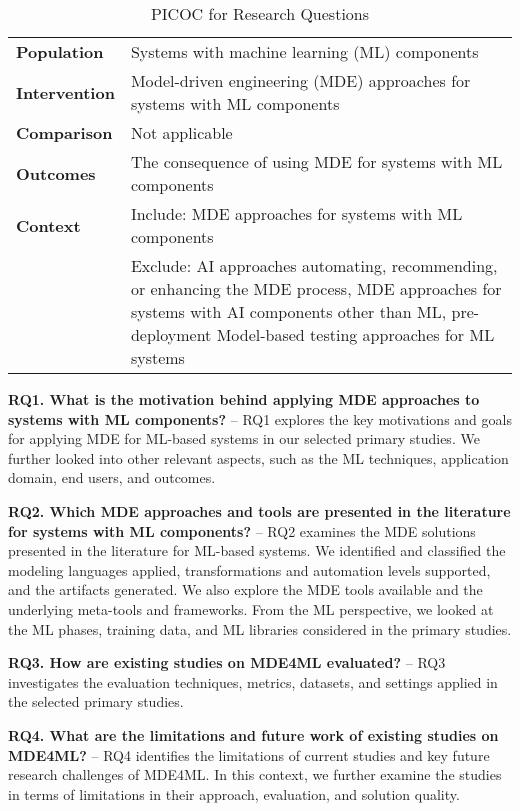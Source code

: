 \begin{table}[htbp]
\centering
\caption{PICOC for Research Questions}
\label{table:picoc}
\footnotesize
\begin{tabular}{ p{2cm} p{13cm}} 
 \hline
 \textbf{Population} & Systems with machine learning (ML) components \TBstrut \\ 
 \textbf{Intervention} & Model-driven engineering (MDE) approaches for systems with ML components  \TBstrut \\
 \textbf{Comparison} & Not applicable  \TBstrut \\
 \textbf{Outcomes} & The consequence of using MDE for systems with ML components \TBstrut \\
 \textbf{Context} & Include: MDE approaches for systems with ML components \TBstrut \\ & Exclude: AI approaches automating, recommending, or enhancing the MDE process, MDE approaches for systems with AI components
other than ML, pre-deployment Model-based testing approaches for ML systems \TBstrut \\ 
\hline
\end{tabular}
\end{table}

\par\textbf{RQ1. What is the motivation behind applying MDE approaches to systems with ML components?} -- RQ1 explores the key motivations and goals for applying MDE for ML-based systems in our selected primary studies. We further looked into other relevant aspects, such as the ML techniques, application domain, end users, and outcomes. 

\par\textbf{RQ2. Which MDE approaches and tools are presented in the literature for systems with ML components?} -- RQ2 examines the MDE solutions presented in the literature for ML-based systems. We identified and classified the modeling languages applied, transformations and automation levels supported, and the artifacts generated. We also explore the MDE tools available and the underlying meta-tools and frameworks. From the ML perspective, we looked at the ML phases, training data, and ML libraries considered in the primary studies.

\par\textbf{RQ3. How are existing studies on MDE4ML evaluated?} -- RQ3 investigates the evaluation techniques, metrics, datasets, and settings applied in the selected primary studies. 

\par\textbf{RQ4. What are the limitations and future work of existing studies on MDE4ML?} -- RQ4 identifies the limitations of current studies and key future research challenges of MDE4ML. In this context, we further examine the studies in terms of limitations in their approach, evaluation, and solution quality. 

